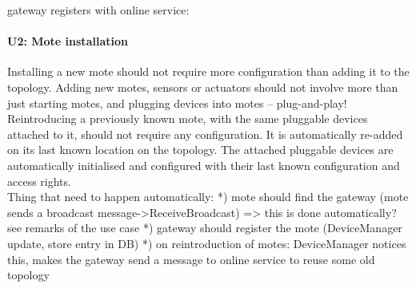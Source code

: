         gateway registers with online service:


    \paragraph{U2: Mote installation}
        Installing a new mote should not require more configuration than adding it
        to the topology. Adding new motes, sensors or actuators should not involve
        more than just starting motes, and plugging devices into motes – plug-and-play!
        Reintroducing a previously known mote, with the same pluggable devices attached to it,
        should not require any configuration. It is automatically re-added on
        its last known location on the topology. The attached pluggable devices
        are automatically initialised and configured with their last known
        configuration and access rights. \\
        Thing that need to happen automatically:
        *) mote should find the gateway (mote sends a broadcast message->ReceiveBroadcast) => this is done automatically? see remarks of the use case
        *) gateway should register the mote (DeviceManager update, store entry in DB)
        *) on reintroduction of motes: DeviceManager notices this, makes the gateway send a message to online service to reuse some old topology

